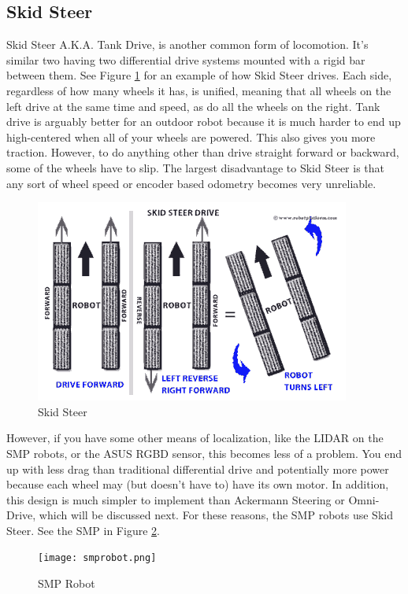 
\subsection{Skid Steer}
\label{sec:skidsteer}
Skid Steer A.K.A. Tank Drive, is another common form of locomotion. It's similar two having two differential drive systems mounted with a rigid bar between them. See Figure \ref{fig:skid_steer_drive} for an example of how Skid Steer drives. Each side, regardless of how many wheels it has, is unified, meaning that all wheels on the left drive at the same time and speed, as do all the wheels on the right. Tank drive is arguably better for an outdoor robot because it is much harder to end up high-centered when all of your wheels are powered. This also gives you more traction. However, to do anything other than drive straight forward or backward, some of the wheels have to slip. The largest disadvantage to Skid Steer is that any sort of wheel speed or encoder based odometry becomes very unreliable.

\begin{figure}[h]
\centering
\includegraphics[scale=0.7]{skid_steer_drive.png}
\caption{Skid Steer}
\label{fig:skid_steer_drive}
\end{figure} 

However, if you have some other means of localization, like the LIDAR on the SMP robots, or the ASUS RGBD sensor, this becomes less of a problem. You end up with less drag than traditional differential drive and potentially more power because each wheel may (but doesn't have to) have its own motor. In addition, this design is much simpler to implement than Ackermann Steering or Omni-Drive, which will be discussed next. For these reasons, the SMP robots use Skid Steer. See the SMP in Figure \ref{fig:smprobot}.

\begin{figure}[h]
\centering
\texttt{[image: smprobot.png]}
\caption{SMP Robot}
\label{fig:smprobot}
\end{figure} 

